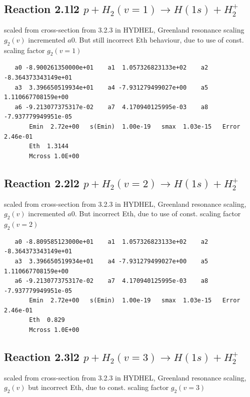 \documentclass[12pt,dvipdfmx]{article}
\begin{document}
\subsection{
Reaction 2.1l2 $   p + H_2(v=1) \rightarrow H(1s) + H_2^+$}

scaled from cross-section from 3.2.3 in HYDHEL, Greenland resonance scaling \cite{kn:Green} $g_2(v)$
incremented $a0$. But still incorrect Eth behaviour, due to use of const. scaling factor  $g_2(v=1)$

\begin{small}\begin{verbatim}
   a0 -8.900261350000e+01    a1  1.057326823133e+02    a2 -8.364373343149e+01
   a3  3.396650519934e+01    a4 -7.931279499027e+00    a5  1.110667708159e+00
   a6 -9.213077375317e-02    a7  4.170940125995e-03    a8 -7.937779949951e-05
       Emin  2.72e+00   s(Emin)  1.00e-19   smax  1.03e-15   Error  2.46e-01
       Eth  1.3144
       Mcross 1.0E+00
\end{verbatim}\end{small}
\subsection{
Reaction 2.2l2 $   p + H_2(v=2) \rightarrow H(1s) + H_2^+$}

scaled from cross-section from 3.2.3 in HYDHEL, Greenland resonance scaling, \cite{kn:Green} $g_2(v)$
incremented $a0$. But incorrect Eth, due to use of const. scaling factor $g_2(v=2)$

\begin{small}\begin{verbatim}
   a0 -8.809585123000e+01    a1  1.057326823133e+02    a2 -8.364373343149e+01
   a3  3.396650519934e+01    a4 -7.931279499027e+00    a5  1.110667708159e+00
   a6 -9.213077375317e-02    a7  4.170940125995e-03    a8 -7.937779949951e-05
       Emin  2.72e+00   s(Emin)  1.00e-19   smax  1.03e-15   Error  2.46e-01
       Eth  0.829
       Mcross 1.0E+00
\end{verbatim}\end{small}


\subsection{
Reaction 2.3l2 $   p + H_2(v=3) \rightarrow H(1s) + H_2^+$}

scaled from cross-section from 3.2.3 in HYDHEL, Greenland resonance scaling, \cite{kn:Green} $g_2(v)$
but incorrect Eth, due to const. scaling factor $g_2(v=3)$
\end{document}
